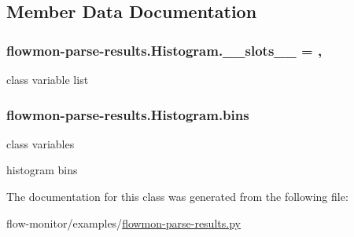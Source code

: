 \subsection{Member Data Documentation}
\subsubsection[{\texorpdfstring{\+\_\+\+\_\+slots\+\_\+\+\_\+}{__slots__}}]{\setlength{\rightskip}{0pt plus 5cm}flowmon-\/parse-\/results.\+Histogram.\+\_\+\+\_\+slots\+\_\+\+\_\+ = \textquotesingle{}\hspace{0.3cm}{\ttfamily [static]}, {\ttfamily [private]}}\hypertarget{classflowmon-parse-results_1_1Histogram_af8bb5ae68154881ec7cc3253a5597588}{}\label{classflowmon-parse-results_1_1Histogram_af8bb5ae68154881ec7cc3253a5597588}


class variable list 

\subsubsection[{\texorpdfstring{bins}{bins}}]{\setlength{\rightskip}{0pt plus 5cm}flowmon-\/parse-\/results.\+Histogram.\+bins}\hypertarget{classflowmon-parse-results_1_1Histogram_af01bbd23926e4fa0ba1fe7933d695f62}{}\label{classflowmon-parse-results_1_1Histogram_af01bbd23926e4fa0ba1fe7933d695f62}


class variables

histogram bins 



The documentation for this class was generated from the following file\+:\begin{DoxyCompactItemize}
\item 
flow-\/monitor/examples/\hyperlink{flowmon-parse-results_8py}{flowmon-\/parse-\/results.\+py}\end{DoxyCompactItemize}
